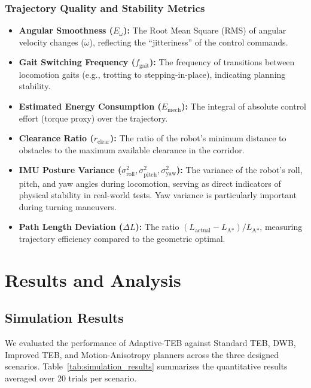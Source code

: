 \documentclass[lettersize,journal]{IEEEtran}
\begin{document}
\subsubsection{Trajectory Quality and Stability Metrics}
\begin{itemize}
\item \textbf{Angular Smoothness ($E_{\dot{\omega}}$):} The Root Mean Square (RMS) of angular velocity changes ($\dot{\omega}$), reflecting the ``jitteriness'' of the control commands.
\item \textbf{Gait Switching Frequency ($f_{\text{gait}}$):} The frequency of transitions between locomotion gaits (e.g., trotting to stepping-in-place), indicating planning stability.
\item \textbf{Estimated Energy Consumption ($E_{\text{mech}}$):} The integral of absolute control effort (torque proxy) over the trajectory.
\item \textbf{Clearance Ratio ($r_{\text{clear}}$):} The ratio of the robot's minimum distance to obstacles to the maximum available clearance in the corridor.
\item \textbf{IMU Posture Variance ($\sigma^2_{\text{roll}}, \sigma^2_{\text{pitch}}, \sigma^2_{\text{yaw}}$):} The variance of the robot's roll, pitch, and yaw angles during locomotion, serving as direct indicators of physical stability in real-world tests. Yaw variance is particularly important during turning maneuvers.
\item \textbf{Path Length Deviation ($\Delta L$):} The ratio $(L_{\text{actual}} - L_{\text{A*}}) / L_{\text{A*}}$, measuring trajectory efficiency compared to the geometric optimal.
\end{itemize}


\section{Results and Analysis}

\subsection{Simulation Results}
We evaluated the performance of Adaptive-TEB against Standard TEB, DWB, Improved TEB, and Motion-Anisotropy planners across the three designed scenarios. Table~\ref{tab:simulation_results} summarizes the quantitative results averaged over 20 trials per scenario.
\end{document}
